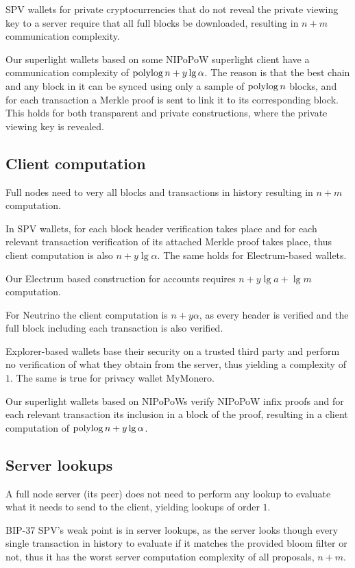 SPV wallets for private cryptocurrencies that do not reveal the private viewing key to a server require that all full blocks be downloaded, resulting in $n+m$ communication complexity.

Our superlight wallets based on some NIPoPoW superlight client have a communication complexity of $\operatorname{polylog}{n} + y\lg{\alpha}$. The reason is that the best chain and any block in it can be synced using only a sample of $\operatorname{polylog}{n}$ blocks, and for each transaction a Merkle proof is sent to link it to its corresponding block. This holds for both transparent and private constructions, where the private viewing key is revealed.

\subsection{Client computation}
Full nodes need to very all blocks and transactions in history resulting in $n+m$ computation.

In SPV wallets, for each block header verification takes place and for each relevant transaction verification of its attached Merkle proof takes place, thus client computation is also $n+y\lg{\alpha}$. The same holds for Electrum-based wallets.

Our Electrum based construction for accounts requires $n+y\lg{a}+\lg{m}$ computation.

For Neutrino the client computation is $n+y\alpha$, as every header is verified and the full block including each transaction is also verified.

Explorer-based wallets base their security on a trusted third party and perform no verification of what they obtain from the server, thus yielding a complexity of $1$. The same is true for privacy wallet MyMonero.

Our superlight wallets based on NIPoPoWs verify NIPoPoW infix proofs and for each relevant transaction its inclusion in a block of the proof, resulting in a client computation of $\operatorname{polylog}{n} + y\lg{\alpha}$.

\subsection{Server lookups}

A full node server (its peer) does not need to perform any lookup to evaluate what it needs to send to the client, yielding lookups of order $1$.

BIP-37 SPV's weak point is in server lookups, as the server looks though every single transaction in history to evaluate if it matches the provided bloom filter or not, thus it has the worst server computation complexity of all proposals, $n+m$.

